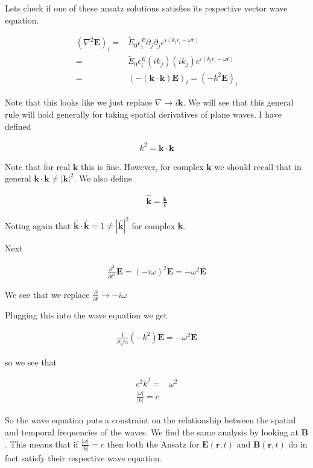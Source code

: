 \documentclass[12pt]{article}
\newcommand{\ep}{\epsilon}
\renewcommand{\vec}[1]{\boldsymbol{#1}}
\newcommand{\unitvec}[1]{\hat{\boldsymbol{#1}}}
\begin{document}
Lets check if one of these ansatz solutions satisfies its respective vector wave equation.

\begin{align}
\left(\nabla^2 \vec{E}\right)_i =& \tilde{E}_0 \ep_i^E \partial_j \partial_j e^{i(k_l r_l - \omega t)}\\
=& \tilde{E}_0 \ep_i^E (ik_j) (ik_j) e^{i(k_l r_l - \omega t)}\\
=& \left(-(\vec{k}\cdot\vec{k}) \vec{E}\right)_i = \left(-k^2\vec{E}\right)_i
\end{align} 

Note that this looks like we just replace $\nabla \rightarrow i\vec{k}$. 
We will see that this general rule will hold generally for taking spatial derivatives of plane waves.
I have defined

\begin{align}
k^2 = \vec{k}\cdot\vec{k}
\end{align}

Note that for real $\vec{k}$ this is fine.
However, for complex $\vec{k}$ we should recall that in general $\vec{k}\cdot\vec{k} \neq \left|\vec{k}\right|^2$.
We also define

\begin{align}
\unitvec{k} = \frac{\vec{k}}{k}
\end{align}

Noting again that $\unitvec{k}\cdot\unitvec{k} = 1 \neq \left|\unitvec{k}\right|^2$ for complex $\vec{k}$.

Next

\begin{align}
\frac{\partial^2}{\partial t^2}\vec{E} = (-i\omega)^2 \vec{E} = -\omega^2 \vec{E}
\end{align}

We see that we replace $\frac{\partial}{\partial t} \rightarrow -i\omega$

Plugging this into the wave equation we get

\begin{align}
\frac{1}{\mu_0\ep_0} (-k^2)\vec{E} = -\omega^2 \vec{E}
\end{align}

so we see that

\begin{align}
c^2 k^2 =& \omega^2\\
\frac{|\omega|}{|k|} = c
\end{align}

So the wave equation puts a constraint on the relationship between the spatial and temporal frequencies of the waves.
We find the same analysis by looking at $\vec{B}$.
This means that if $\frac{|\omega|}{|k|} = c$ then both the Ansatz for $\vec{E}(\vec{r},t)$ and $\vec{B}(\vec{r},t)$ do in fact satisfy their respective wave equation.
\end{document}
